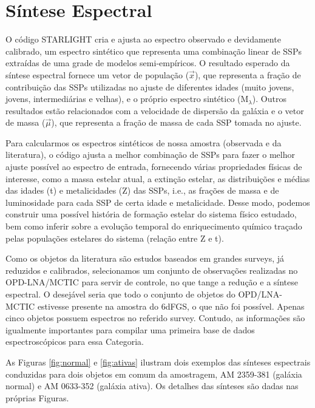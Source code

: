 \section{Síntese Espectral}

O código STARLIGHT cria e ajusta ao espectro observado e devidamente calibrado, um espectro sintético que representa uma combinação linear de SSPs extraídas de uma grade de modelos semi-empíricos. O resultado esperado da síntese espectral fornece um vetor de população ($\vec{x}$), que representa a fração de contribuição das SSPs utilizadas no ajuste de diferentes idades (muito jovens, jovens, intermediárias e velhas), e o próprio espectro sintético (M$_{\lambda}$). Outros resultados estão relacionados com a velocidade de dispersão da galáxia e o vetor de massa ($\vec{\mu}$), que representa a fração de massa de cada SSP tomada no ajuste.

Para calcularmos os espectros sintéticos de nossa amostra (observada e da literatura), o código ajusta a melhor combinação de SSPs para fazer o melhor ajuste possível ao espectro de entrada, fornecendo várias propriedades 
físicas de interesse, como a massa estelar atual, a extinção estelar, as distribuições e médias das idades (t) e metalicidades (Z) das SSPs, i.e., as frações de massa e de luminosidade para cada SSP de certa idade e metalicidade. Desse modo, podemos construir uma possível história de formação estelar do sistema físico estudado, bem como inferir sobre a evolução temporal do enriquecimento químico traçado pelas populações estelares do sistema (relação entre Z e t).

Como os objetos da literatura são estudos baseados em grandes surveys, já reduzidos e calibrados, selecionamos um conjunto de observações realizadas no OPD-LNA/MCTIC para servir de controle, no que tange a redução e a síntese espectral. O desejável seria que todo o conjunto de objetos do OPD/LNA-MCTIC estivesse presente na amostra do 6dFGS, o que não foi possível. Apenas cinco objetos possuem espectros no referido survey. Contudo, as informações são igualmente importantes para compilar uma primeira base de dados espectroscópicos para essa Categoria.

As Figuras \ref{fig:normal} e \ref{fig:ativas} ilustram dois exemplos das sínteses espectrais conduzidas para dois objetos em comum da amostragem, AM 2359-381 (galáxia normal) e AM 0633-352 (galáxia ativa). Os detalhes das sínteses são dadas nas próprias Figuras.

